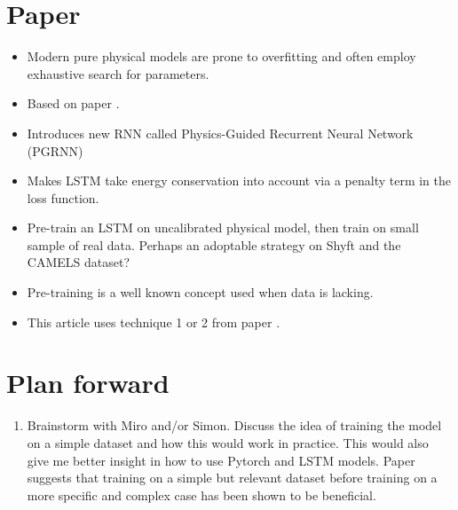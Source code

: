 \documentclass[a4paper,12pt,english]{article}
\begin{document}
\section*{Paper \cite{lake}}
\begin{itemize}
\item Modern pure physical models are prone to overfitting and often employ exhaustive search for parameters.
\item Based on paper \cite{hybrid_paper}.
\item Introduces new RNN called Physics-Guided Recurrent Neural Network (PGRNN)
\item Makes LSTM take energy conservation into account via a penalty term in the loss function.
\item Pre-train an LSTM on uncalibrated physical model, then train on small sample of real data. Perhaps an adoptable strategy on Shyft and the CAMELS dataset? 
\item Pre-training is a well known concept used when data is lacking.
\item This article uses technique 1 or 2 from paper \cite{hybrid_paper}.
\end{itemize}

\section*{Plan forward}
\begin{enumerate}
\item Brainstorm with Miro and/or Simon. Discuss the idea of training the model on a simple dataset and how this would work in practice. This would also give me better insight in how to use Pytorch and LSTM models. Paper \cite{hybrid_paper} suggests that training on a simple but relevant dataset before training on a more specific and complex case has been shown to be beneficial.
\end{enumerate}



\end{document}
